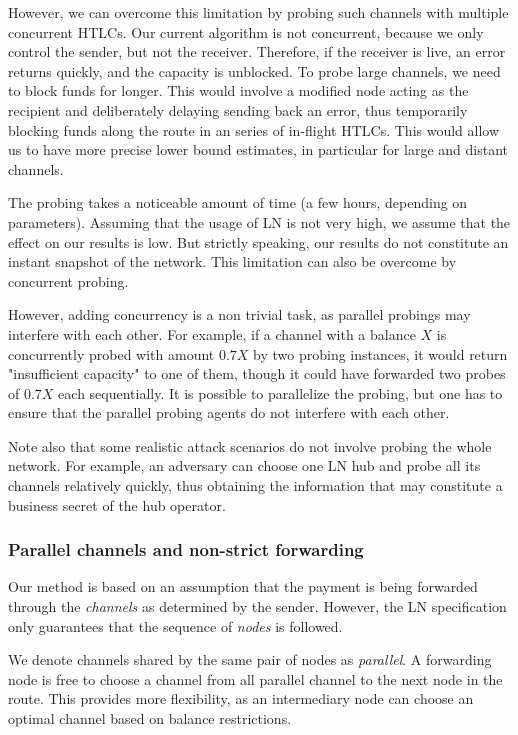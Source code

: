 However, we can overcome this limitation by probing such channels with multiple concurrent HTLCs.
Our current algorithm is not concurrent, because we only control the sender, but not the receiver.
Therefore, if the receiver is live, an error returns quickly, and the capacity is unblocked.
To probe large channels, we need to block funds for longer.
This would involve a modified node acting as the recipient and deliberately delaying sending back an error, thus temporarily blocking funds along the route in an series of in-flight HTLCs.
This would allow us to have more precise lower bound estimates, in particular for large and distant channels.

The probing takes a noticeable amount of time (a few hours, depending on parameters).
Assuming that the usage of LN is not very high, we assume that the effect on our results is low.
But strictly speaking, our results do not constitute an instant snapshot of the network.
This limitation can also be overcome by concurrent probing.

However, adding concurrency is a non trivial task, as parallel probings may interfere with each other.
For example, if a channel with a balance $X$ is concurrently probed with amount $0.7X$ by two probing instances, it would return "insufficient capacity" to one of them, though it could have forwarded two probes of $0.7X$ each sequentially.
It is possible to parallelize the probing, but one has to ensure that the parallel probing agents do not interfere with each other.

Note also that some realistic attack scenarios do not involve probing the whole network.
For example, an adversary can choose one LN hub and probe all its channels relatively quickly, thus obtaining the information that may constitute a business secret of the hub operator.

\subsubsection*{Parallel channels and non-strict forwarding}

Our method is based on an assumption that the payment is being forwarded through the \textit{channels} as determined by the sender.
However, the LN specification only guarantees that the sequence of \textit{nodes} is followed.

We denote channels shared by the same pair of nodes as \textit{parallel}.
A forwarding node is free to choose a channel from all parallel channel to the next node in the route.
This provides more flexibility, as an intermediary node can choose an optimal channel based on balance restrictions.

